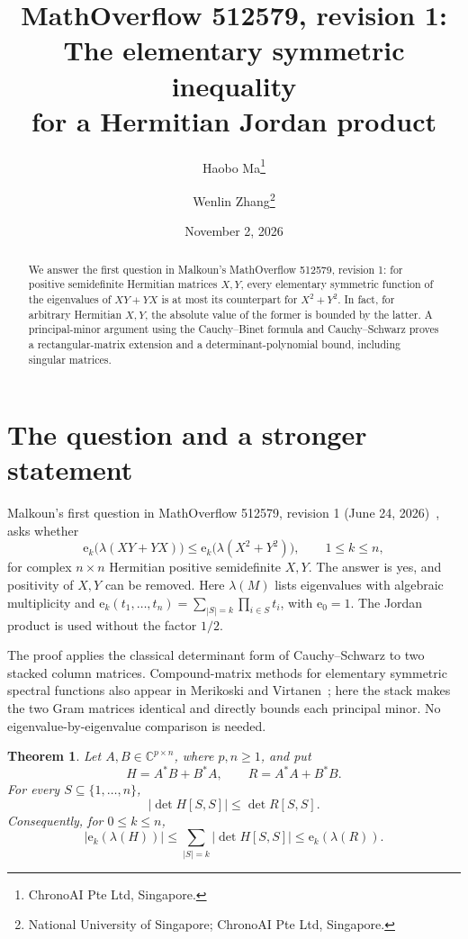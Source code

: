 \documentclass[11pt]{article}
\title{MathOverflow 512579, revision 1:\\
The elementary symmetric inequality\\for a Hermitian Jordan product}
\author{Haobo Ma\thanks{ChronoAI Pte Ltd, Singapore.}
\and Wenlin Zhang\thanks{National University of Singapore;
ChronoAI Pte Ltd, Singapore.}}
\date{November 2, 2026}
\newtheorem{theorem}{Theorem}
\newcommand{\CC}{\mathbb C}
\newcommand{\ee}{\mathrm e}
\begin{document}
\maketitle
\begin{abstract}
We answer the first question in Malkoun's MathOverflow 512579, revision 1:
for positive semidefinite Hermitian matrices $X,Y$, every elementary symmetric
function of the eigenvalues of $XY+YX$ is at most its counterpart for $X^2+Y^2$.
In fact, for arbitrary Hermitian $X,Y$, the absolute value of the former is
bounded by the latter. A principal-minor argument using the
Cauchy--Binet formula and Cauchy--Schwarz proves a rectangular-matrix extension
and a determinant-polynomial bound, including singular matrices.
\end{abstract}

\section{The question and a stronger statement}
Malkoun's first question in MathOverflow 512579, revision 1
(June 24, 2026)~\cite{malkoun}, asks whether
\begin{equation}\label{eq:posed}
 \ee_k\bigl(\lambda(XY+YX)\bigr)
 \leq \ee_k\bigl(\lambda(X^2+Y^2)\bigr),\qquad 1\leq k\leq n,
\end{equation}
for complex $n\times n$ Hermitian positive semidefinite $X,Y$.
The answer is yes, and positivity of $X,Y$ can be removed.
Here $\lambda(M)$ lists eigenvalues with algebraic multiplicity and
$\ee_k(t_1,\ldots,t_n)=\sum_{|S|=k}\prod_{i\in S}t_i$, with $\ee_0=1$.
The Jordan product is used without the factor $1/2$.

The proof applies the classical determinant form of Cauchy--Schwarz to two
stacked column matrices. Compound-matrix methods for elementary symmetric
spectral functions also appear in Merikoski and Virtanen~\cite[\S\S2--3,6]{mv};
here the stack makes the two Gram matrices identical and directly bounds each
principal minor. No eigenvalue-by-eigenvalue comparison is needed.

\begin{theorem}\label{thm:main}
Let $A,B\in\CC^{p\times n}$, where $p,n\geq1$, and put
\[
 H=A^*B+B^*A,\qquad R=A^*A+B^*B.
\]
For every $S\subseteq\{1,\ldots,n\}$,
\begin{equation}\label{eq:principal}
 |\det H[S,S]|\leq\det R[S,S].
\end{equation}
Consequently, for $0\leq k\leq n$,
\begin{equation}\label{eq:strong}
 \bigl|\ee_k(\lambda(H))\bigr|
 \leq\sum_{|S|=k}|\det H[S,S]|
 \leq\ee_k(\lambda(R)).
\end{equation}
\end{theorem}
\end{document}
